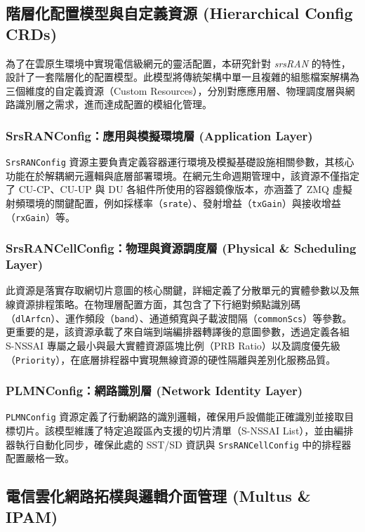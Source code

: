 \subsection{階層化配置模型與自定義資源 (Hierarchical Config CRDs)}
\label{subsec:hierarchical_config_model}

為了在雲原生環境中實現電信級網元的靈活配置，本研究針對 \textit{srsRAN} 的特性，設計了一套階層化的配置模型。此模型將傳統架構中單一且複雜的組態檔案解構為三個維度的自定義資源（Custom Resources），分別對應應用層、物理調度層與網路識別層之需求，進而達成配置的模組化管理。

\subsubsection{SrsRANConfig：應用與模擬環境層 (Application Layer)}
\texttt{SrsRANConfig} 資源主要負責定義容器運行環境及模擬基礎設施相關參數，其核心功能在於解耦網元邏輯與底層部署環境。在網元生命週期管理中，該資源不僅指定了 CU-CP、CU-UP 與 DU 各組件所使用的容器鏡像版本，亦涵蓋了 ZMQ 虛擬射頻環境的關鍵配置，例如採樣率（\texttt{srate}）、發射增益（\texttt{txGain}）與接收增益（\texttt{rxGain}）等。

\subsubsection{SrsRANCellConfig：物理與資源調度層 (Physical \& Scheduling Layer)}
此資源是落實存取網切片意圖的核心關鍵，詳細定義了分散單元的實體參數以及無線資源排程策略。在物理層配置方面，其包含了下行絕對頻點識別碼（\texttt{dlArfcn}）、運作頻段（\texttt{band}）、通道頻寬與子載波間隔（\texttt{commonScs}）等參數。更重要的是，該資源承載了來自端到端編排器轉譯後的意圖參數，透過定義各組 S-NSSAI 專屬之最小與最大實體資源區塊比例（PRB Ratio）以及調度優先級（\texttt{Priority}），在底層排程器中實現無線資源的硬性隔離與差別化服務品質。

\subsubsection{PLMNConfig：網路識別層 (Network Identity Layer)}
\texttt{PLMNConfig} 資源定義了行動網路的識別邏輯，確保用戶設備能正確識別並接取目標切片。該模型維護了特定追蹤區內支援的切片清單（S-NSSAI List），並由編排器執行自動化同步，確保此處的 SST/SD 資訊與 \texttt{SrsRANCellConfig} 中的排程器配置嚴格一致。

\subsection{電信雲化網路拓樸與邏輯介面管理 (Multus \& IPAM)}
\label{subsec:multus_ipam_management}

